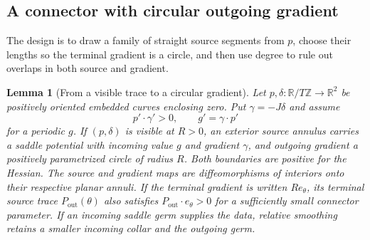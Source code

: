 \documentclass[11pt]{amsart}
\newtheorem{lemma}[theorem]{Lemma}
\theoremstyle{definition}
\theoremstyle{remark}
\newcommand{\R}{\mathbb R}\newcommand{\Sph}{\mathbb S}
\numberwithin{equation}{section}
\begin{document}
\subsection{A connector with circular outgoing gradient}
The design is to draw a family of straight source segments from $p$,
choose their lengths so the terminal gradient is a circle, and then use
degree to rule out overlaps in both source and gradient.
\begin{lemma}[From a visible trace to a circular gradient]\label{lem:connector}
Let $p,\delta:\R/T\mathbb Z\to\R^2$ be positively oriented embedded
curves enclosing zero. Put $\gamma=-J\delta$ and assume
\begin{equation}\label{eq:connector-data}
 p'\cdot\gamma'>0,\qquad g'=\gamma\cdot p'
\end{equation}
for a periodic $g$. If $(p,\delta)$ is visible at $R>0$, an exterior
source annulus carries a saddle potential with incoming value $g$ and
gradient $\gamma$, and outgoing gradient a positively parametrized
circle of radius $R$. Both boundaries are positive for the Hessian.
The source and gradient maps are diffeomorphisms of interiors onto their
respective planar annuli. If the terminal gradient is written
$Re_\theta$, its terminal source trace $P_\mathrm{out}(\theta)$ also
satisfies $P_\mathrm{out}\cdot e_\theta>0$ for a sufficiently small
connector parameter. If an incoming saddle germ supplies the data,
relative smoothing retains a smaller incoming collar and the outgoing germ.
\end{lemma}
\end{document}
